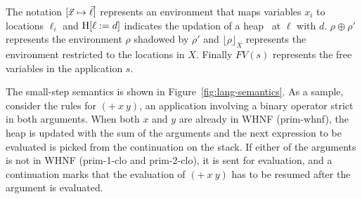 \documentclass[9pt]{sigplanconf}
\def\myvec{\mathaccent"017E }
\begin{document}
The notation  $[\myvec{x}   \mapsto  \myvec{\ell}]$   represents  an
environment that maps variables $x_i$
to locations $\ell_i$
and  $\mbox{H}[\ell :=  d]$
indicates the  updation of  a heap \heap\  at $\ell$ with  $d$.  $\rho
\oplus \rho'$  represents the  environment $\rho$ shadowed  by $\rho'$
and $\lfloor \rho \rfloor_X$  represents the environment restricted to
the locations in $X$. Finally $FV(s)$ represents the free variables in
the application $s$.

The small-step semantics  is shown in Figure~\ref{fig:lang-semantics}.
As  a sample,  consider  the  rules  for  $(+~x~y)$, an  application
involving a binary operator strict in both arguments.   When
both $x$  and $y$ are already  in WHNF ({\sc prim-whnf}),  the heap is
updated with the  sum of the arguments and  the next expression to be
evaluated is picked from the continuation on the stack. If either of the
arguments is not in
WHNF  ({\sc  prim-1-clo}  and   {\sc  prim-2-clo}),  it  is  sent  for
evaluation, and a continuation  marks that the evaluation of $(+~x~y)$
has to be resumed after the argument is evaluated.
\end{document}
